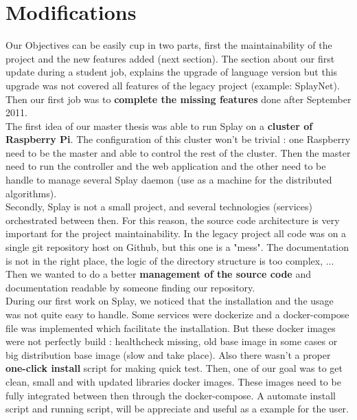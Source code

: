 \documentclass{eplmastersthesis}
\begin{document}
    \section{Modifications} %

      Our Objectives can be easily cup in two parts, first the maintainability
      of the project and the new features added (next section). The section
      about our first update during a student job, explains the upgrade of
      language version but this upgrade was not covered all features of the
      legacy project (example: SplayNet). Then our first job was to
      \textbf{complete the missing features} done after  September 2011.\\

      The first idea of our master thesis was able to run Splay on a
      \textbf{cluster of Raspberry Pi}. The configuration of this cluster won't
      be trivial : one Raspberry need to be the master and able to control the
      rest of the cluster. Then the master need to run the controller and the
      web application and the other need to be handle to manage several Splay
      daemon (use as a machine for the distributed algorithms). \\

      Secondly, Splay is not a small project, and several technologies
      (services) orchestrated between then. For this reason, the source code
      architecture is very important for the project maintainability. In the
      legacy project all code was on a single git repository host on Github,
      but this one is a "mess". The documentation is not in the right place,
      the logic of the directory structure is too complex, ... Then we wanted
      to do a better \textbf{management of the source code} and documentation
      readable by someone finding our repository. \\

      During our first work on Splay, we noticed that the installation and the
      usage was not quite easy to handle. Some services were dockerize and a
      docker-compose file was implemented which facilitate the installation.
      But these docker images were not perfectly build : healthcheck missing,
      old base image in some cases or big distribution base image (slow and
      take place). Also there wasn't a proper \textbf{one-click install}
      script for making quick test. Then, one of our goal was to get clean,
      small and with updated libraries docker images. These images need to be
      fully integrated between then through the docker-compose. A automate
      install script and running script, will be appreciate and useful as a
      example for the user.\\
\end{document}
